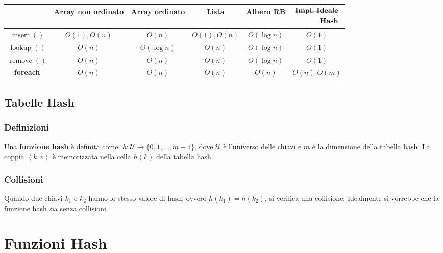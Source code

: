        \begin{table}
            \centering
            \begin{tabular}{|c|c|c|c|c|c|}
                \hline
                & \textbf{Array non ordinato} & \textbf{Array ordinato} & \textbf{Lista} & \textbf{Albero RB} & $\begin{aligned}\st{\textbf{Impl. Ideale}}\\ \textbf{Hash}\end{aligned}$\\
                \hline
                $\operatorname{insert}()$ & $O(1), O(n)$ & $O(n)$ & $O(1), O(n)$ & $O(\log n)$ & $O(1)$\\
                \hline
                $\operatorname{lookup}()$ & $O(n)$ & $O(\log n)$ & $O(n)$ & $O(\log n)$ & $O(1)$\\
                \hline
                $\operatorname{remove}()$ & $O(n)$ & $O(n)$ & $O(n)$ & $O(\log n)$ & $O(1)$\\
                \hline
                \textbf{foreach} & $O(n)$ & $O(n)$ & $O(n)$ & $O(n)$ & \st{$O(n)$} $O(m)$\\
                \hline
            \end{tabular}
        \end{table}

    \subsection{Tabelle Hash}
        \subsubsection{Definizioni}
            Una \textbf{funzione hash} è definita come: $h: \mathcal{U} \rightarrow \{0, 1, \dots, m-1\}$, dove $\mathcal{U}$ è l'universo delle chiavi e $m$ è la dimensione della tabella hash.\newline
            La coppia $\left< k, v \right>$ è memorizzata nella cella $h(k)$ della tabella hash.
        \subsubsection{Collisioni}
            Quando due chiavi $k_1$ e $k_2$ hanno lo stesso valore di hash, ovvero $h(k_1) = h(k_2)$, si verifica una collisione. Idealmente si vorrebbe che la funzione hash sia senza collisioni.
\section{Funzioni Hash}
